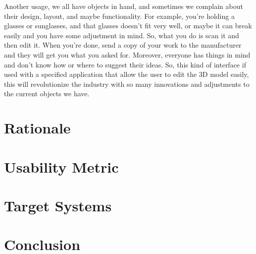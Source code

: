 \documentclass[12pt, oneside]{article}   	%
\begin{document}
Another usage, we all have objects in hand, and sometimes we complain about their design, layout, and maybe functionality. For example, you're holding a glasses or sunglasses, and that glasses doesn't fit very well, or maybe it can break easily and you have some adjustment in mind. So, what you do is scan it and then edit it.  When you're done, send a copy of your work to the manufacturer and they will get you what you asked for.  Moreover, everyone has things in mind and don't know how or where to suggest their ideas.  So, this kind of interface if used with a specified application that allow the user to edit the 3D model easily, this will revolutionize the industry with so many innovations and adjustments to the current objects we have.  

\section{Rationale}
\paragraph{}
\section{Usability Metric}
\paragraph{}
\section{Target Systems}
\paragraph{}
\section{Conclusion}
\paragraph{}
\end{document}
